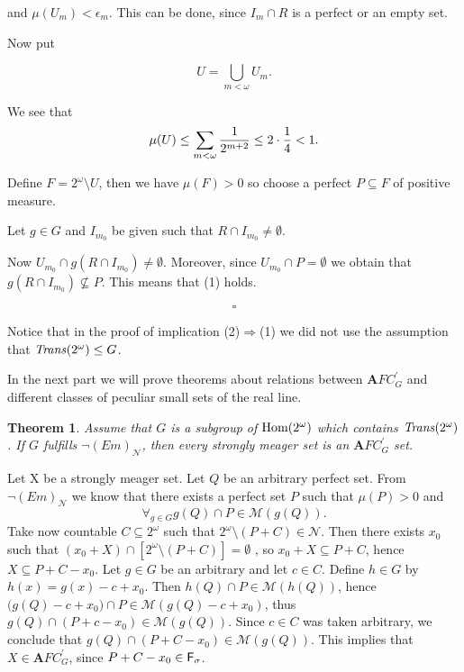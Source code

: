 \documentclass[b5cutpaper, twoside, 11pt, leqno]{moravica}
\newcommand{\eps}{\epsilon}
\newcommand{\afcp}{{\mathbf AFC}^\prime}
\newcommand\afcg{\afcp_{G}}
\newcommand\trans{{\it Trans}(\ca)}
\newcommand{\seq}{\subseteq}
\newcommand{\ca}{2^{\omega}}
\newcommand{\mgr}{{\mathcal M}}
\newcommand{\neglig}{{\mathcal N}}
\newcommand{\fsigma}{{\sf F}_{\sigma}}
\newcommand{\cantor}{\ca}
\newcommand\Hom{{\rm Hom(\ca)}}
\newtheorem{theorem}{Theorem}[section]
\theoremstyle{definition}
\begin{document}
and $\mu(U_{m}) < \eps_{m}$.
This can be done, since
$I_m \cap R$ is a perfect or an empty set.

Now put

\[ U = \bigcup_{m < \omega} U_m. \]

We see that
\[
\mu(U) \leq \sum_{m < \omega}
{1 \over 2^{m + 2}} \leq 2 \cdot {1 \over 4} < 1.
\]

Define $F = \cantor \setminus U$, then we have
$\mu(F) > 0$
so choose a perfect $P \seq F$ of positive
measure.

  Let $g \in G$ and $I_{m_0}$ be given such that
$R \cap I_{m_0} \not = \emptyset$.

Now $U_{m_0} \cap g(R \cap I_{m_0}) \not = \emptyset$.
Moreover, since
$U_{m_0} \cap P = \emptyset$
we obtain that $g(R \cap I_{m_0}) \not \seq P$.
This means that (1) holds.

  \[ \square \]

Notice that in the proof of implication (2)$\Rightarrow$(1)
we did not use the assumption that
$\trans \leq G$.

\bigskip

  In the next part we will prove theorems about relations between
$\afcg$ and different classes of peculiar small sets of the real line.

\begin{theorem}
\label{-em=>N}
  Assume that $G$ is a subgroup
of $\Hom$ which contains $\trans$.
  If $G$ fulfills $\neg (Em)_{\neglig}$,
then every strongly meager set is an $\afcg$ set.
\end{theorem}

\proof

Let X be a strongly meager set.
Let $Q$ be an arbitrary perfect set.
From $\neg (Em)_{\neglig}$ we know that there exists a perfect
set $P$ such that $\mu (P) > 0$ and
  \[ \forall_{g \in G} g(Q) \cap P \in \mgr(g(Q)). \]
Take now countable $C \seq \cantor $ such that
$\cantor \setminus (P + C) \in \neglig$.
  Then there exists $x_0$ such that $(x_0 +X) \cap
[ \cantor \setminus (P + C) ] = \emptyset $ ,
so $x_0 + X \seq P + C$, hence $X \seq P + C - x_0$.
  Let $g \in G$ be an arbitrary and let $c \in C$.
Define $h \in G$ by $h(x) = g(x) - c + x_0$.
  Then $h(Q) \cap P \in \mgr(h(Q))$, hence
$\big( g(Q) - c + x_0\big) \cap P \in \mgr(g(Q) - c + x_0)$,
thus $g(Q) \cap (P + c - x_0) \in \mgr(g(Q))$.
  Since $c \in C$ was taken arbitrary, we conclude that
$g(Q) \cap (P + C - x_0) \in \mgr(g(Q))$.
  This implies that $X \in \afcg$, since $P + C - x_0 \in \fsigma$.
\end{document}
